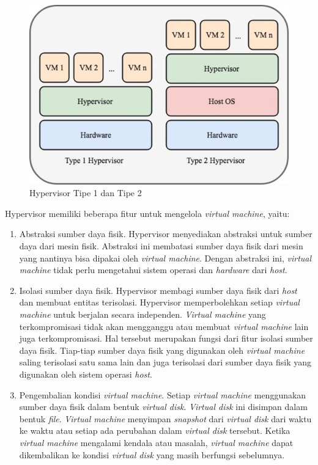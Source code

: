 \begin{figure}[H]
  \centering
  \includegraphics[scale=0.55]{gambar/Type-1-and-type-2-hypervisors.png}
  \caption{Hypervisor Tipe 1 dan Tipe 2 \parencite{nfv}}
  \label{fig:arsitektur-hypervisor-1-2}
\end{figure}

Hypervisor memiliki beberapa fitur untuk mengelola \emph{virtual machine}, yaitu:

\begin{enumerate}
  
  \item Abstraksi sumber daya fisik. Hypervisor menyediakan abstraksi untuk sumber
    daya dari mesin fisik. Abstraksi ini membatasi sumber daya fisik dari mesin yang
    nantinya bisa dipakai oleh \emph{virtual machine}. Dengan abstraksi ini,
    \emph{virtual machine} tidak perlu mengetahui sistem operasi dan \emph{hardware}
    dari \emph{host}.

  \item Isolasi sumber daya fisik. Hypervisor membagi sumber daya fisik dari \emph{host}
    dan membuat entitas terisolasi. Hypervisor memperbolehkan setiap \emph{virtual machine} 
    untuk berjalan secara independen. \emph{Virtual machine} yang terkompromisasi tidak
    akan mengganggu atau membuat \emph{virtual machine} lain juga terkompromisasi. Hal
    tersebut merupakan fungsi dari fitur isolasi sumber daya fisik. Tiap-tiap sumber daya fisik
    yang digunakan oleh \emph{virtual machine} saling terisolasi satu sama lain dan juga
    terisolasi dari sumber daya fisik yang digunakan oleh sistem operasi \emph{host}.

  \item Pengembalian kondisi \emph{virtual machine}. Setiap \emph{virtual machine} menggunakan
    sumber daya fisik dalam bentuk \emph{virtual disk}. \emph{Virtual disk} ini disimpan
    dalam bentuk \emph{file}. \emph{Virtual machine} menyimpan \emph{snapshot} dari \emph{virtual disk}
    dari waktu ke waktu atau setiap ada perubahan dalam \emph{virtual disk} tersebut. Ketika \emph{virtual machine}
    mengalami kendala atau masalah, \emph{virtual machine} dapat dikembalikan ke kondisi \emph{virtual disk}
    yang masih berfungsi sebelumnya.

\end{enumerate}

